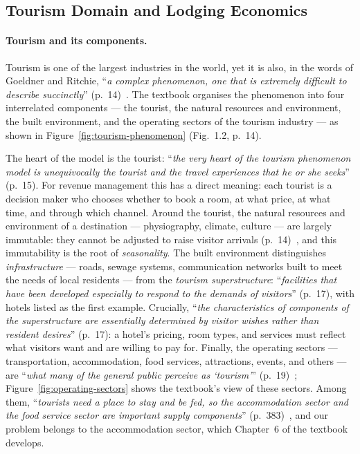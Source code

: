 \subsection{Tourism Domain and Lodging Economics}

\paragraph{Tourism and its components.}
Tourism is one of the largest industries in the world, yet it is also, in the words of Goeldner and Ritchie, ``\emph{a complex phenomenon, one that is extremely difficult to describe succinctly}'' (p.~14)~\cite{goeldner2009}. The textbook organises the phenomenon into four interrelated components --- the tourist, the natural resources and environment, the built environment, and the operating sectors of the tourism industry --- as shown in Figure~\ref{fig:tourism-phenomenon} (Fig.~1.2, p.~14).

The heart of the model is the tourist: ``\emph{the very heart of the tourism phenomenon model is unequivocally the tourist and the travel experiences that he or she seeks}'' (p.~15). For revenue management this has a direct meaning: each tourist is a decision maker who chooses whether to book a room, at what price, at what time, and through which channel. Around the tourist, the natural resources and environment of a destination --- physiography, climate, culture --- are largely immutable: they cannot be adjusted to raise visitor arrivals (p.~14)~\cite{goeldner2009}, and this immutability is the root of \emph{seasonality}. The built environment distinguishes \emph{infrastructure} --- roads, sewage systems, communication networks built to meet the needs of local residents --- from the \emph{tourism superstructure}: ``\emph{facilities that have been developed especially to respond to the demands of visitors}'' (p.~17), with hotels listed as the first example. Crucially, ``\emph{the characteristics of components of the superstructure are essentially determined by visitor wishes rather than resident desires}'' (p.~17): a hotel's pricing, room types, and services must reflect what visitors want and are willing to pay for. Finally, the operating sectors --- transportation, accommodation, food services, attractions, events, and others --- are ``\emph{what many of the general public perceive as `tourism'}'' (p.~19)~\cite{goeldner2009}; Figure~\ref{fig:operating-sectors} shows the textbook's view of these sectors. Among them, ``\emph{tourists need a place to stay and be fed, so the accommodation sector and the food service sector are important supply components}'' (p.~383)~\cite{goeldner2009}, and our problem belongs to the accommodation sector, which Chapter~6 of the textbook develops.

